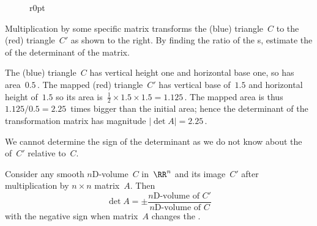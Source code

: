 \begin{wrapfigure}r{0pt}
\end{wrapfigure}
\begin{example} 
Multiplication by some specific matrix transforms the (blue) triangle~\(C\) to the (red) triangle~\(C'\) as shown to the right.  By finding the ratio of the s, estimate the  of the determinant of the matrix.

\begin{solution} 
The (blue) triangle~\(C\) has vertical height one and horizontal base one, so has area~\(0.5\)\,.
The mapped (red) triangle~\(C'\) has vertical base of~\(1.5\) and horizontal height of~\(1.5\) so its area is~\(\frac12\times1.5\times1.5=1.125\)\,.
The mapped area is thus \(1.125/0.5=2.25\)~times bigger than the initial area; hence the determinant of the transformation matrix has magnitude \(|\det A|=2.25\)\,.

We cannot determine the sign of the determinant as we do not know about the  of~\(C'\) relative to~\(C\).
\end{solution}
\end{example}



\begin{theorem} \label{thm:detanyC} 
Consider any  smooth $n$D-volume~\(C\) in~\(\RR^n\) and its image~\(C'\) after multiplication by \(n\times n\) matrix~\(A\).
Then
\begin{equation*}
\det A=\pm\frac{\text{$n$D-volume of }C'}
{\text{$n$D-volume of }C}
\end{equation*}
with the negative sign when matrix~\(A\) changes the .
\end{theorem}

